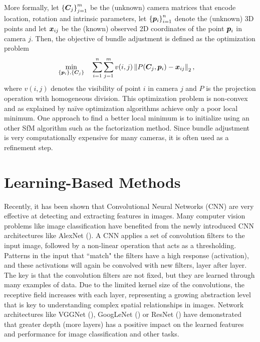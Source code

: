 			More formally, let 
			$\left \lbrace \bm{C}_j \right \rbrace_{j = 1}^{m}$ 
			be the (unknown) camera matrices that encode location, rotation and intrinsic parameters, let 
			$\left \lbrace \bm{p}_i \right \rbrace_{i = 1}^{n}$ 
			denote the (unknown) 3D points and let $\bm{x}_{ij}$ be the (known) observed 2D coordinates of the point $\bm{p}_i$ in camera $j$.
			Then, the objective of bundle adjustment is defined as the optimization problem 
			\begin{equation}\label{eq:bundle_adjustment}
				\begin{aligned}
					& \underset{\left\lbrace \bm{p}_i \right\rbrace, \left\lbrace \bm{C}_j \right\rbrace}{\text{min}}
					& & \sum_{i = 1}^{n} \sum_{j = 1}^{m} v(i, j) \left\| P(\bm{C}_j, \bm{p}_i) - \bm{x}_{ij} \right\|_2 ,
				\end{aligned}
			\end{equation}
			where $v(i, j)$ denotes the visibility of point $i$ in camera $j$ and $P$ is the projection operation with homogeneous division.
			This optimization problem is non-convex and as explained by \cite{survey2017} na\"ive optimization algorithms achieve only a poor local minimum.
			One approach to find a better local minimum is to initialize using an other SfM algorithm such as the factorization method.
			Since bundle adjustment is very computationally expensive for many cameras, it is often used as a refinement step.
			
	\section{Learning-Based Methods}
	\label{sec:learning_based_methods}
	
		Recently, it has been shown that Convolutional Neural Networks (CNN) are very effective at detecting and extracting features in images. 
		Many computer vision problems like image classification have benefited from the newly introduced CNN architectures like AlexNet (\cite{krizhevsky2012imagenet}).
		A CNN applies a set of convolution filters to the input image, followed by a non-linear operation that acts as a thresholding. 
		Patterns in the input that ``match" the filters have a high response (activation), and these activations will again be convolved with new filters, layer after layer.
		The key is that the convolution filters are not fixed, but they are learned through many examples of data.
		Due to the limited kernel size of the convolutions, the receptive field increases with each layer, representing a growing abstraction level that is key to understanding complex spatial relationships in images.
		Network architectures like VGGNet (\cite{simonyan2014very}), GoogLeNet (\cite{szegedy2015going}) or ResNet (\cite{he2016deep}) have demonstrated that greater depth (more layers) has a positive impact on the learned features and performance for image classification and other tasks.
	
